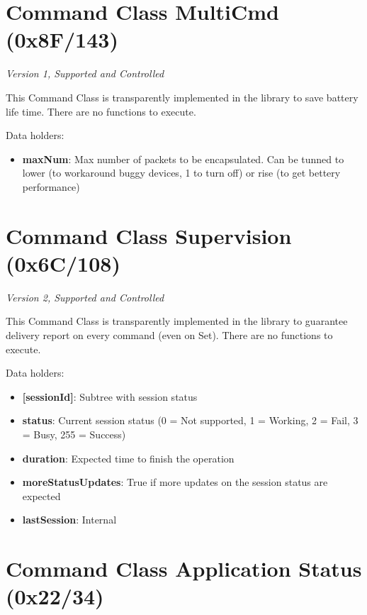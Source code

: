 \section{Command Class MultiCmd (0x8F/143)}

\textit{Version 1, Supported and Controlled}
\newline

This Command Class is transparently implemented in the library to save battery life time. There are no functions to execute.
\newline

\noindent
Data holders:

\begin{itemize}
\item \textbf{maxNum}: Max number of packets to be encapsulated. Can be tunned to lower (to workaround buggy devices, 1 to turn off) or rise (to get bettery performance)
\end{itemize}


\section{Command Class Supervision (0x6C/108)}

\textit{Version 2, Supported and Controlled}
\newline

This Command Class is transparently implemented in the library to guarantee delivery report on every command (even on Set). There are no functions to execute.
\newline

\noindent
Data holders:

\begin{itemize}
\item \textbf{[sessionId]}: Subtree with session status
\item \qquad\textbf{status}: Current session status (0 = Not supported, 1 = Working, 2 = Fail, 3 = Busy, 255 = Success)
\item \qquad\textbf{duration}: Expected time to finish the operation
\item \qquad\textbf{moreStatusUpdates}: True if more updates on the session status are expected
\item \textbf{lastSession}: Internal
\end{itemize}


\section{Command Class Application Status (0x22/34)}

